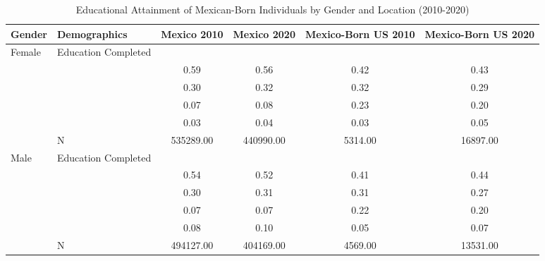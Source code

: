 \begin{table}[ht]
\centering
\caption{Educational Attainment of Mexican-Born Individuals by Gender and Location (2010-2020)} 
\begingroup\small
\begin{tabular}{l>{\raggedright\arraybackslash}p{3.2cm}|cccc}
  \hline
Gender & Demographics & Mexico 2010 & Mexico 2020 & Mexico-Born US 2010 & Mexico-Born US 2020 \\ 
  \hline
Female & Education Completed &  &  &  &  \\ 
   & \multicolumn{1}{>{\raggedleft\arraybackslash}p{3.2cm}|}{\makebox[3.2cm][r]{Less than Primary }} & 0.59 & 0.56 & 0.42 & 0.43 \\ 
   & \multicolumn{1}{>{\raggedleft\arraybackslash}p{1.7cm}|}{\makebox[1.7cm][r]{Primary }} & 0.30 & 0.32 & 0.32 & 0.29 \\ 
   & \multicolumn{1}{>{\raggedleft\arraybackslash}p{2cm}|}{\makebox[2cm][r]{Secondary }} & 0.07 & 0.08 & 0.23 & 0.20 \\ 
   & \multicolumn{1}{>{\raggedleft\arraybackslash}p{2cm}|}{\makebox[2cm][r]{University }} & 0.03 & 0.04 & 0.03 & 0.05 \\ 
   & N & 535289.00 & 440990.00 & 5314.00 & 16897.00 \\ 
  Male & Education Completed &  &  &  &  \\ 
   & \multicolumn{1}{>{\raggedleft\arraybackslash}p{3.2cm}|}{\makebox[3.2cm][r]{Less than Primary }} & 0.54 & 0.52 & 0.41 & 0.44 \\ 
   & \multicolumn{1}{>{\raggedleft\arraybackslash}p{1.7cm}|}{\makebox[1.7cm][r]{Primary }} & 0.30 & 0.31 & 0.31 & 0.27 \\ 
   & \multicolumn{1}{>{\raggedleft\arraybackslash}p{2cm}|}{\makebox[2cm][r]{Secondary }} & 0.07 & 0.07 & 0.22 & 0.20 \\ 
   & \multicolumn{1}{>{\raggedleft\arraybackslash}p{2cm}|}{\makebox[2cm][r]{University }} & 0.08 & 0.10 & 0.05 & 0.07 \\ 
   & N & 494127.00 & 404169.00 & 4569.00 & 13531.00 \\ 
   \hline
\end{tabular}
\endgroup
\end{table}
